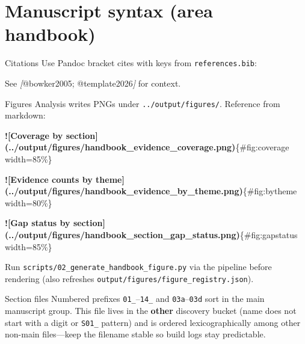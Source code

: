 \documentclass[
  ignorenonframetext,
]{beamer}
\author{\texorpdfstring{}{}}
\date{}
\newenvironment{Shaded}{}{}
\newcommand{\AlertTok}[1]{\textcolor[rgb]{1.00,0.00,0.00}{\textbf{#1}}}
\newcommand{\CommentTok}[1]{\textcolor[rgb]{0.38,0.63,0.69}{\textit{#1}}}
\newcommand{\NormalTok}[1]{#1}
\newcommand{\OtherTok}[1]{\textcolor[rgb]{0.00,0.44,0.13}{#1}}
\begin{document}
\section{Manuscript syntax (area
handbook)}\label{manuscript-syntax-area-handbook}

\begin{frame}[fragile]{Citations}
\protect{}\label{citations}
Use Pandoc bracket cites with keys from \texttt{references.bib}:

\begin{Shaded}
\begin{Highlighting}[]
\NormalTok{See }\CommentTok{[}\OtherTok{@bowker2005; @template2026}\CommentTok{]}\NormalTok{ for context.}
\end{Highlighting}
\end{Shaded}
\end{frame}

\begin{frame}[fragile]{Figures}
\protect{}\label{figures}
Analysis writes PNGs under \texttt{../output/figures/}. Reference from
markdown:

\begin{Shaded}
\begin{Highlighting}[]
\AlertTok{![Coverage by section](../output/figures/handbook\_evidence\_coverage.png)}\NormalTok{\{\#fig:coverage width=85\%\}}

\AlertTok{![Evidence counts by theme](../output/figures/handbook\_evidence\_by\_theme.png)}\NormalTok{\{\#fig:bytheme width=80\%\}}

\AlertTok{![Gap status by section](../output/figures/handbook\_section\_gap\_status.png)}\NormalTok{\{\#fig:gapstatus width=85\%\}}
\end{Highlighting}
\end{Shaded}

Run \texttt{scripts/02\_generate\_handbook\_figure.py} via the pipeline
before rendering (also refreshes
\texttt{output/figures/figure\_registry.json}).
\end{frame}

\begin{frame}[fragile]{Section files}
\protect{}\label{section-files}
Numbered prefixes \texttt{01\_}--\texttt{14\_} and
\texttt{03a}--\texttt{03d} sort in the main manuscript group. This file
lives in the \textbf{other} discovery bucket (name does not start with a
digit or \texttt{S01\_} pattern) and is ordered lexicographically among
other non-main files---keep the filename stable so build logs stay
predictable.
\end{frame}
\end{document}
